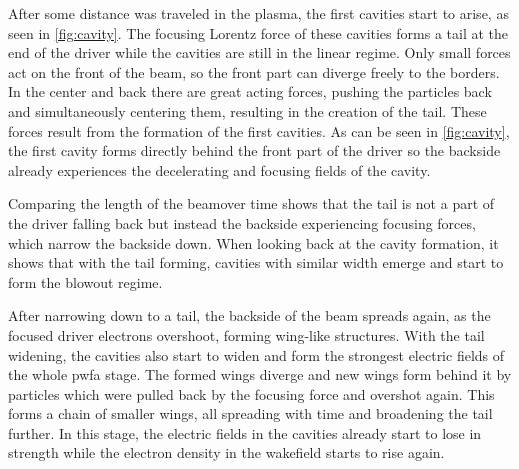 \documentclass[bachelor_thesis]{subfiles}
\begin{document}
After some distance was traveled in the plasma, the first cavities start to arise, as seen in \autoref{fig:cavity}. The focusing Lorentz force of these cavities forms a tail at the end of the driver while the cavities are still in the linear regime.
Only small forces act on the front of the beam, so the front part can diverge freely to the borders. In the center and back there are great acting forces, pushing the particles back and simultaneously centering them, resulting in the creation of the tail.
These forces result from the formation of the first cavities. As can be seen in \autoref{fig:cavity}, the first cavity forms directly behind the front part of the driver so the backside already experiences the decelerating and focusing fields of the cavity.
\begin{figure}
	\centering
	\missingfigure{}
	\caption{}
	\label{fig:cavity}
\end{figure}
Comparing the length of the beamover time shows that the tail is not a part of the driver falling back but instead the backside experiencing focusing forces, which narrow the backside down.
When looking back at the cavity formation, it shows that with the tail forming, cavities with similar width emerge and start to form the blowout regime.

After narrowing down to a tail, the backside of the beam spreads again, as the focused driver electrons overshoot, forming wing-like structures. With the tail widening, the cavities also start to widen and form the strongest electric fields of the whole \gls{pwfa} stage.
The formed wings diverge and new wings form behind it by particles which were pulled back by the focusing force and overshot again. This forms a chain of smaller wings, all spreading with time and broadening the tail further.
In this stage, the electric fields in the cavities already start to lose in strength while the electron density in the wakefield starts to rise again.
\end{document}

